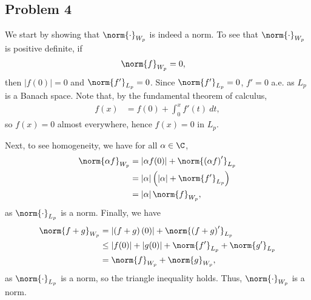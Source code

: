 \documentclass[10pt]{mypackage}
\begin{document}
\subsection{Problem 4}%
We start by showing that $\norm{\cdot}_{W_p}$ is indeed a norm. To see that $\norm{\cdot}_{W_p}$ is positive definite, if
\begin{align*}
  \norm{f}_{W_p} &= 0,
\end{align*}
then $\left\vert f(0) \right\vert = 0$ and $\norm{f'}_{L_p} = 0$. Since $\norm{f'}_{L_p} = 0$, $f' = 0$ a.e. as $L_p$ is a Banach space. Note that, by the fundamental theorem of calculus,
\begin{align*}
  f(x) &= f(0) + \int_{0}^{x} f'(t)\:dt,
\end{align*}
so $f(x) = 0$ almost everywhere, hence $f(x) = 0$ in $L_p$.\newline

Next, to see homogeneity, we have for all $\alpha\in\C$,
\begin{align*}
  \norm{\alpha f}_{W_p} &= \left\vert \alpha f(0) \right\vert + \norm{\left( \alpha f \right)'}_{L_p}\\
                        &= \left\vert \alpha \right\vert\left( \left\vert \alpha \right\vert + \norm{f'}_{L_p} \right)\\
                        &= \left\vert \alpha \right\vert\norm{f}_{W_p},
\end{align*}
as $\norm{\cdot}_{L_p}$ is a norm. Finally, we have
\begin{align*}
  \norm{f + g}_{W_p} &= \left\vert \left( f+g \right)(0) \right\vert + \norm{\left( f+g \right)'}_{L_p}\\
                     &\leq \left\vert f(0) \right\vert + \left\vert g(0) \right\vert + \norm{f'}_{L_p} + \norm{g'}_{L_p}\\
                     &= \norm{f}_{W_p} + \norm{g}_{W_p},
\end{align*}
as $\norm{\cdot}_{L_p}$ is a norm, so the triangle inequality holds. Thus, $\norm{\cdot}_{W_p}$ is a norm.\newline
\end{document}
